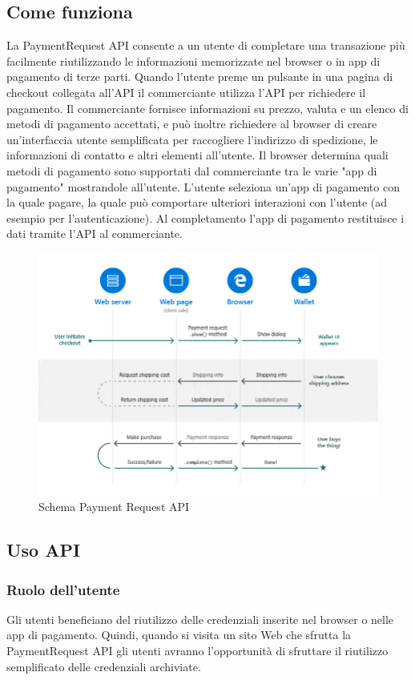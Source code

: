\documentclass[italian]{article}
\begin{document}
	\subsection{Come funziona}	
	La PaymentRequest API consente a un utente di completare una transazione più facilmente riutilizzando le informazioni memorizzate nel browser o in app di pagamento di terze parti.
	Quando l'utente preme un pulsante in una pagina di checkout collegata all'API il commerciante utilizza l'API per richiedere il pagamento. Il commerciante fornisce informazioni su prezzo, valuta e un elenco di metodi di pagamento accettati, e può inoltre richiedere al browser di creare un'interfaccia utente semplificata per raccogliere l'indirizzo di spedizione, le informazioni di contatto e altri elementi all'utente.
	Il browser determina quali metodi di pagamento sono supportati dal commerciante tra le varie "app di pagamento" mostrandole all'utente. 
	L'utente seleziona un'app di pagamento con la quale pagare, la quale può comportare ulteriori interazioni con l'utente (ad esempio per l'autenticazione). 
	Al completamento l'app di pagamento restituisce i dati tramite l'API al commerciante.

	\begin{figure}[h]
		\centering
		\includegraphics[width=1\linewidth]{SchemaPayment}
		\caption{Schema Payment Request API}
		\label{fig:Schema Payment}
	\end{figure}
	\pagebreak
	
	\subsection{Uso API}
	\subsubsection{Ruolo dell'utente}
	Gli utenti beneficiano del riutilizzo delle credenziali inserite nel browser o nelle app di pagamento. Quindi, quando si visita un sito Web che sfrutta la PaymentRequest API gli utenti avranno l'opportunità di sfruttare il riutilizzo semplificato delle credenziali archiviate.
\end{document}
